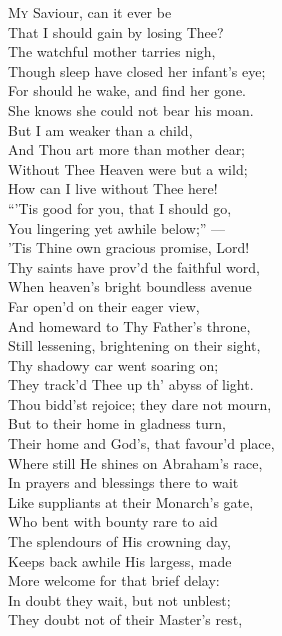 \textsc{My} Saviour, can it ever be \\
 That I should gain by losing Thee? \\
 The watchful mother tarries nigh, \\
 Though sleep have closed her infant’s eye; \\
 For should he wake, and find her gone. \\
 She knows she could not bear his moan. \\
 But I am weaker than a child, \\
 And Thou art more than mother dear; \\
 Without Thee Heaven were but a wild; \\
 How can I live without Thee here! \\
  “’Tis good for you, that I should go, \\
 You lingering yet awhile below;” — \\
 ’Tis Thine own gracious promise, Lord! \\
 Thy saints have prov’d the faithful word, \\
 When heaven’s bright boundless avenue \\
 Far open’d on their eager view, \\
 And homeward to Thy Father’s throne, \\
 Still lessening, brightening on their sight, \\
 Thy shadowy car went soaring on; \\
 They track’d Thee up th’ abyss of light. \\
  Thou bidd’st rejoice; they dare not mourn, \\
 But to their home in gladness turn, \\
 Their home and God’s, that favour’d place, \\
 Where still He shines on Abraham’s race, \\
 In prayers and blessings there to wait \\
 Like suppliants at their Monarch’s gate, \\
 Who bent with bounty rare to aid \\
 The splendours of His crowning day, \\
 Keeps back awhile His largess, made \\
 More welcome for that brief delay: \\
  In doubt they wait, but not unblest; \\
 They doubt not of their Master’s rest, \\
